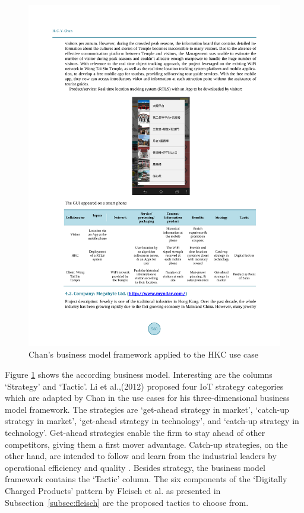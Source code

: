 		\begin{figure}[ht]
		    \begin{center}
		    \includegraphics[scale=1.0]{Talk11/chanexample.pdf}
		    \end{center}
		    \caption{Chan's business model framework applied to the HKC use case \cite[p.~560]{chan}}
		    \label{fig:chan_ex}
		\end{figure}

		Figure \ref{fig:chan_ex} shows the according business model. Interesting are the columns `Strategy' and `Tactic'. Li et al.,(2012) \cite{li} proposed four IoT strategy categories which are adapted by Chan in the use cases for his three-dimensional business model framework. The strategies are `get-ahead strategy in market', `catch-up strategy in market', `get-ahead strategy in technology', and `catch-up strategy in technology'. Get-ahead strategies enable the firm to stay ahead of other competitors, giving them a first mover advantage. Catch-up strategies, on the other hand, are intended to follow and learn from the industrial leaders by operational efficiency and quality \cite{chan}.
		Besides strategy, the business model framework contains the `Tactic' column. The six components of the `Digitally Charged Products' pattern by Fleisch et al. \cite{fleisch} as presented in Subsection~\ref{subsec:fleisch} are the proposed tactics to choose from.


